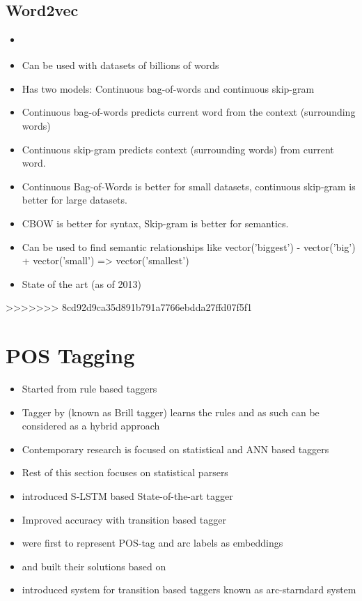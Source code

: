 \documentclass[12pt,a4paper,english
]{tutthesis}
\begin{document}
\subsection{Word2vec}
\begin{itemize}
\item \cite{Mikolov2013}
\item Can be used with datasets of billions of words
\item Has two models: Continuous bag-of-words and continuous skip-gram
\item Continuous bag-of-words predicts current word from the context (surrounding words)
\item Continuous skip-gram predicts context (surrounding words) from current word.
\item Continuous Bag-of-Words is better for small datasets, continuous skip-gram is better for large datasets.
\item CBOW is better for syntax, Skip-gram is better for semantics.
\item Can be used to find semantic relationships like vector('biggest') - vector('big') + vector('small') => vector('smallest') 
\item State of the art (as of 2013)
\end{itemize}

>>>>>>> 8cd92d9ca35d891b791a7766ebdda27ffd07f5f1

\section{POS Tagging}
\label{se:pos_tagging}
\begin{itemize}
\item Started from rule based taggers
\item Tagger by \cite{Brill1992} (known as Brill tagger) learns the rules and as such can be considered as a hybrid approach
\item Contemporary research is focused on statistical and ANN based taggers
\item Rest of this section focuses on statistical parsers
\item \cite{Ling2015} introduced S-LSTM based State-of-the-art tagger
\item \cite{Andor2016} Improved accuracy with transition based tagger
\item \cite{Chen2014} were first to represent POS-tag and arc labels as embeddings
\item \cite{Andor2016} and \cite{Weiss2015} built their solutions based on \cite{Chen2014}
\item \cite{Nivre2004} introduced system for transition based taggers known as arc-starndard system \cite{Chen2014}
\end{itemize}
\end{document}
